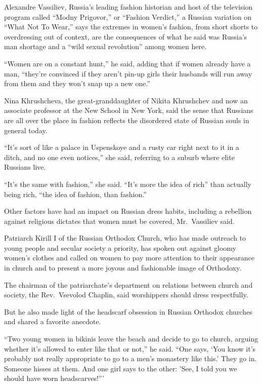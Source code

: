 ﻿\documentclass[12pt]{article}
\begin{document}
Alexandre Vassiliev, Russia's leading fashion historian and host of the television program called
``Modny Prigovor,'' or ``Fashion Verdict,'' a Russian variation on ``What Not To Wear,'' says the
extremes in women's fashion, from short shorts to overdressing out of context, are the consequences
of what he said was Russia's man shortage and a ``wild sexual revolution'' among women here.

``Women are on a constant hunt,'' he said, adding that if women already have a man, ``they're
convinced if they aren't pin-up girls their husbands will run away from them and they won't snap up
a new one.''

Nina Khrushcheva, the great-granddaughter of Nikita Khrushchev and now an associate professor at the
New School in New York, said the sense that Russians are all over the place in fashion reflects the
disordered state of Russian souls in general today.

``It's sort of like a palace in Uspenskoye and a rusty car right next to it in a ditch, and no one
even notices,'' she said, referring to a suburb where elite Russians live.

``It's the same with fashion,'' she said. ``It's more the idea of rich'' than actually being rich,
``the idea of fashion, than fashion.''

Other factors have had an impact on Russian dress habits, including a rebellion against religious
dictates that women must be covered, Mr.~Vassiliev said.

Patriarch Kirill I of the Russian Orthodox Church, who has made outreach to young people and secular
society a priority, has spoken out against gloomy women's clothes and called on women to pay more
attention to their appearance in church and to present a more joyous and fashionable image of
Orthodoxy.

The chairman of the patriarchate's department on relations between church and society, the
Rev.~Vsevolod Chaplin, said worshippers should dress respectfully.

But he also made light of the headscarf obsession in Russian Orthodox churches and shared a favorite
anecdote.

``Two young women in bikinis leave the beach and decide to go to church, arguing whether it's
allowed to enter like that or not,'' he said. ``One says, `You know it's probably not really
appropriate to go to a men's monastery like this.' They go in. Someone hisses at them. And one girl
says to the other: 'See, I told you we should have worn headscarves!'''
\end{document}
